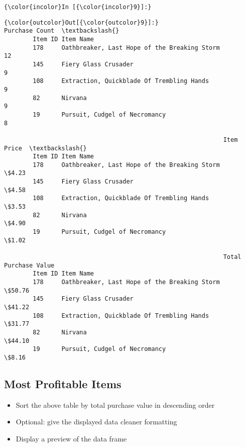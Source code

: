 \documentclass[11pt]{article}
\begin{document}
    \begin{Verbatim}[commandchars=\\\{\}]
{\color{incolor}In [{\color{incolor}9}]:} 
\end{Verbatim}


\begin{Verbatim}[commandchars=\\\{\}]
{\color{outcolor}Out[{\color{outcolor}9}]:}                                                      Purchase Count  \textbackslash{}
        Item ID Item Name                                                     
        178     Oathbreaker, Last Hope of the Breaking Storm             12   
        145     Fiery Glass Crusader                                      9   
        108     Extraction, Quickblade Of Trembling Hands                 9   
        82      Nirvana                                                   9   
        19      Pursuit, Cudgel of Necromancy                             8   
        
                                                             Item Price  \textbackslash{}
        Item ID Item Name                                                 
        178     Oathbreaker, Last Hope of the Breaking Storm      \$4.23   
        145     Fiery Glass Crusader                              \$4.58   
        108     Extraction, Quickblade Of Trembling Hands         \$3.53   
        82      Nirvana                                           \$4.90   
        19      Pursuit, Cudgel of Necromancy                     \$1.02   
        
                                                             Total Purchase Value  
        Item ID Item Name                                                          
        178     Oathbreaker, Last Hope of the Breaking Storm               \$50.76  
        145     Fiery Glass Crusader                                       \$41.22  
        108     Extraction, Quickblade Of Trembling Hands                  \$31.77  
        82      Nirvana                                                    \$44.10  
        19      Pursuit, Cudgel of Necromancy                               \$8.16  
\end{Verbatim}
            
    \subsection{Most Profitable Items}\label{most-profitable-items}

    \begin{itemize}
\item
  Sort the above table by total purchase value in descending order
\item
  Optional: give the displayed data cleaner formatting
\item
  Display a preview of the data frame
\end{itemize}
\end{document}
